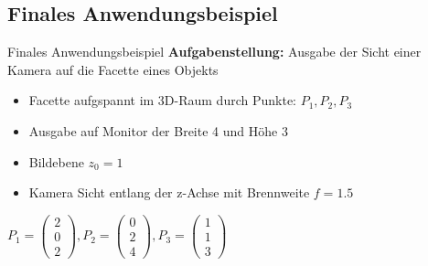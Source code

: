 \documentclass[10pt,aspectratio=169]{beamer}
\begin{document}
  \subsection{Finales Anwendungsbeispiel}
  \begin{frame}{Finales Anwendungsbeispiel}
    \textbf{Aufgabenstellung:} Ausgabe der Sicht einer Kamera auf die Facette eines Objekts
    \begin{itemize}
      \item Facette aufgspannt im 3D-Raum durch Punkte: $P_1, P_2, P_3$
      \item Ausgabe auf Monitor der Breite 4 und Höhe 3
      \item Bildebene $z_0 = 1$
      \item Kamera Sicht entlang der z-Achse mit Brennweite $f=1.5$
    \end{itemize}
    \begin{center}
      $P_1 = \begin{pmatrix}
        2\\0\\2
      \end{pmatrix}, P_2 = \begin{pmatrix}
        0\\2\\4
      \end{pmatrix},
      P_3 = \begin{pmatrix}
        1\\1\\3
      \end{pmatrix}
      $
    \end{center}
  \end{frame}
\end{document}
